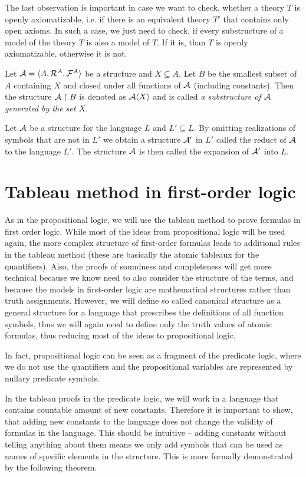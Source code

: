 The last observation is important in case we want to check, whether a theory $T$ is openly axiomatizable, i.e. if there is an equivalent theory $T'$ that contains only open axioms. In such a case, we just need to check, if every substructure of a model of the theory $T$ is also a model of $T$. If it is, than $T$ is openly axiomatizable, otherwise it is not.

Let $\mathcal{A} = \langle A, \mathcal{R}^A, \mathcal{F}^A \rangle$ be a structure and $X \subseteq A$. Let $B$ be the smallest subset of $A$ containing $X$ and closed under all functions of $\mathcal{A}$ (including constants). Then the structure $\mathcal{A} \upharpoonright B$ is denoted as $\mathcal{A}\langle X \rangle$ and is called \emph{a substructure of $\mathcal{A}$ generated by the set $X$}. 

Let $\mathcal{A}$ be a structure for the language $L$ and $L'\subseteq L$. By omitting realizations of symbols that are not in $L'$ we obtain a structure $\mathcal{A}'$ in $L'$ called the reduct of $\mathcal{A}$ to the language $L'$. The structure $\mathcal{A}$ is then called the expansion of $\mathcal{A}'$ into $L$.

\chapter{Tableau method in first-order logic}

As in the propositional logic, we will use the tableau method to prove formulas in first order logic. While most of the ideas from propositional logic will be used again, the more complex structure of first-order formulas leads to additional rules in the tableau method (these are basically the atomic tableaux for the quantifiers). Also, the proofs of soundness and completeness will get more technical because we know need to also consider the structure of the terms, and because the models in first-order logic are mathematical structures rather than truth assignments. However, we will define so called canonical structure as a general structure for a language that prescribes the definitions of all function symbols, thus we will again need to define only the truth values of atomic formulas, thus reducing most of the ideas to propositional logic.

In fact, propositional logic can be seen as a fragment of the predicate logic, where we do not use the quantifiers and the propositional variables are represented by nullary predicate symbols.

In the tableau proofs in the predicate logic, we will work in a language that contains countable amount of new constants. Therefore it is important to show, that adding new constants to the language does not change the validity of formulas in the language. This should be intuitive -- adding constants without telling anything about them means we only add symbols that can be used as names of specific elements in the structure. This is more formally demonstrated by the following theorem.

